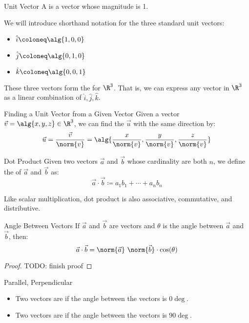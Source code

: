 \documentclass[12pt]{report}
\begin{document}
\begin{dfnbox}{Unit Vector}{}
    A  is a vector whose magnitude is 1.
\end{dfnbox}

We will introduce shorthand notation for the three standard unit vectors:
\begin{itemize}
    \item $\hat{i} \coloneq \alg{1,0,0}$
    \item $\hat{j} \coloneq \alg{0,1,0}$
    \item $\hat{k} \coloneq \alg{0,0,1}$
\end{itemize}
These three vectors form the  for $\R^3$. That is, we can express any vector in $\R^3$ as a linear combination of $\hat{i}, \hat{j}, \hat{k}$.

\begin{tecbox}{Finding a Unit Vector from a Given Vector}{}
    Given a vector $\vec{v} = \alg{x, y, z} \in \R^3$, we can find the  $\vec{u}$ with the same direction by:
    \[ \vec{u} = \frac{\vec{v}}{\norm{v}} = \alg{\frac{x}{\norm{v}}, \frac{y}{\norm{v}}, \frac{z}{\norm{v}}} \]
\end{tecbox}

\begin{dfnbox}{Dot Product}{}
    Given two vectors $\vec{a}$ and $\vec{b}$ whose cardinality are both $n$, we define the  of $\vec{a}$ and $\vec{b}$ as:
    \[ \vec{a} \cdot \vec{b} \coloneq a_1b_1 + \cdots + a_nb_n \]
\end{dfnbox}

Like scalar multiplication, dot product is also associative, commutative, and distributive.

\begin{thmbox}{Angle Between Vectors}{}
    If $\vec{a}$ and $\vec{b}$ are vectors and $\theta$ is the angle between $\vec{a}$ and $\vec{b}$, then:
    \[ \vec{a} \cdot \vec{b} = \norm{\vec{a}} \ \norm{\vec{b}} \cdot \cos(\theta) \]
    \tcblower
    \begin{proof}
        TODO: finish proof
    \end{proof}
\end{thmbox}

\begin{dfnbox}{Parallel, Perpendicular}{}
    \begin{itemize}[noitemsep]
        \item Two vectors are  if the angle between the vectors is $0\deg$.
        \item Two vectors are  if the angle between the vectors is $90\deg$.
    \end{itemize}
\end{dfnbox}
\end{document}
